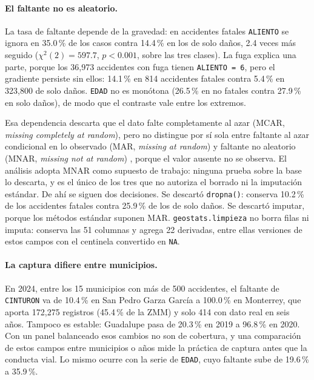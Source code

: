 \paragraph{El faltante no es aleatorio.} La tasa de faltante depende de la
gravedad: en accidentes fatales \texttt{ALIENTO} se ignora en 35.0\,\% de los
casos contra 14.4\,\% en los de solo daños, 2.4 veces más seguido
($\chi^2(2) = 597.7$, $p < 0.001$, sobre las tres clases). La fuga explica una
parte, porque los 36,973 accidentes con fuga tienen \texttt{ALIENTO = 6}, pero el
gradiente persiste sin ellos: 14.1\,\% en 814 accidentes fatales contra 5.4\,\%
en 323,800 de solo daños. \texttt{EDAD} no es monótona (26.5\,\% en no fatales
contra 27.9\,\% en solo daños), de modo que el contraste vale entre los extremos.

Esa dependencia descarta que el dato falte completamente al azar (MCAR,
\emph{missing completely at random}), pero no distingue por sí sola entre
faltante al azar condicional en lo observado (MAR, \emph{missing at random}) y
faltante no aleatorio (MNAR, \emph{missing not at random})
\parencite{rubin1976inference}, porque el valor ausente no se observa. El análisis adopta MNAR como supuesto de trabajo: ninguna
prueba sobre la base lo descarta, y es el único de los tres que no autoriza el
borrado ni la imputación estándar.
De ahí se siguen dos decisiones. Se descartó \texttt{dropna()}: conserva 10.2\,\%
de los accidentes fatales contra 25.9\,\% de los de solo daños. Se descartó
imputar, porque los métodos estándar suponen MAR. \texttt{geostats.limpieza} no
borra filas ni imputa: conserva las 51 columnas y agrega 22 derivadas, entre ellas
versiones de estos campos con el centinela convertido en \texttt{NA}.

\paragraph{La captura difiere entre municipios.} En 2024, entre los 15 municipios
con más de 500 accidentes, el faltante de \texttt{CINTURON} va de 10.4\,\% en San
Pedro Garza García a 100.0\,\% en Monterrey, que aporta 172,275 registros
(45.4\,\% de la ZMM) y solo 414 con dato real en seis años. Tampoco es estable:
Guadalupe pasa de 20.3\,\% en 2019 a 96.8\,\% en 2020. Con un panel balanceado
esos cambios no son de cobertura, y una comparación de estos campos entre
municipios o años mide la práctica de captura antes que la conducta vial. Lo mismo
ocurre con la serie de \texttt{EDAD}, cuyo faltante sube de 19.6\,\% a 35.9\,\%.

